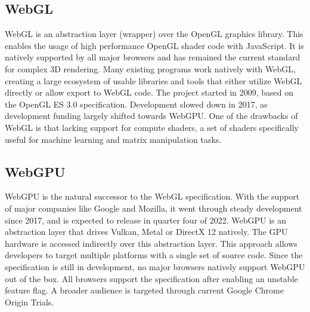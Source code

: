 \subsection{WebGL}
WebGL is an abstraction layer (wrapper) over the OpenGL graphics
library. This enables the usage of high performance OpenGL shader code
with JavaScript. It is natively supported by all major browsers and has
remained the current standard for complex 3D rendering.
%
Many existing programs work natively with WebGL, creating a large
ecosystem of usable libraries and tools that either utilize WebGL
directly or allow export to WebGL code. The project started in 2009,
based on the OpenGL ES 3.0 specification. Development slowed down in
2017, as development funding largely shifted towards WebGPU. One of the
drawbacks of WebGL is that lacking support for compute shaders, a set of
shaders specifically useful for machine learning and matrix manipulation
tasks.

\subsection{WebGPU}
WebGPU is the natural successor to the WebGL specification. With the
support of major companies like Google and Mozilla, it went through
steady development since 2017, and is expected to release in quarter
four of 2022. WebGPU is an abstraction layer that drives Vulkan, Metal
or DirectX 12 natively. The GPU hardware is accessed indirectly over
this abstraction layer. This approach allows developers to target
multiple platforms with a single set of source code.
%
Since the specification is still in development, no major browsers
natively support WebGPU out of the box. All browsers support the
specification after enabling an unstable feature flag. A broader
audience is targeted through current Google Chrome Origin Trials.

